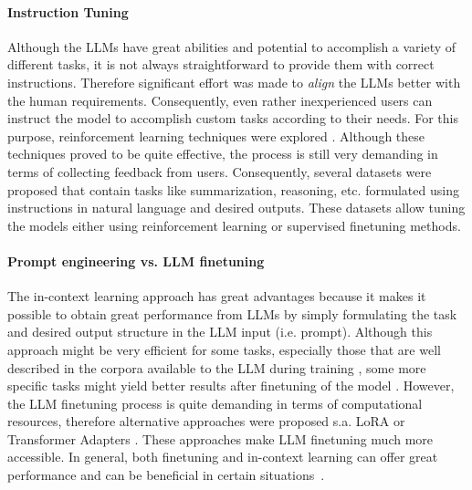 \paragraph{Instruction Tuning}
Although the LLMs have great abilities and potential to accomplish a variety of different tasks, it is not always straightforward to provide them with correct instructions.
Therefore significant effort was made to \emph{align} the LLMs better with the human requirements.
Consequently, even rather inexperienced users can instruct the model to accomplish custom tasks according to their needs.
For this purpose, reinforcement learning techniques were explored \cite{ziegler2019fine,ouyang2022training}.
Although these techniques proved to be quite effective, the process is still very demanding in terms of collecting feedback from users.
Consequently, several datasets were proposed \cite{supernaturalinstructions,black2022gpt} that contain tasks like summarization, reasoning, etc. formulated using instructions in natural language and desired outputs.
These datasets allow tuning the models either using reinforcement learning or supervised finetuning methods.

\paragraph{Prompt engineering vs. LLM finetuning}
The in-context learning approach has great advantages because it makes it possible to obtain great performance from LLMs by simply formulating the task and desired output structure in the LLM input (i.e. prompt).
Although this approach might be very efficient for some tasks, especially those that are well described in the corpora available to the LLM during training \cite{wei2022emergent}, some more specific tasks might yield better results after finetuning of the model \cite{tu-etal-2022-prompt}.
However, the LLM finetuning process is quite demanding in terms of computational resources, therefore alternative approaches were proposed s.a. LoRA \cite{hu2021lora} or Transformer Adapters \cite{pfeiffer2020AdapterHub}.
These approaches make LLM finetuning much more accessible.
In general, both finetuning and in-context learning can offer great performance and can be beneficial in certain situations~\cite{mosbach-etal-2023-shot}.

